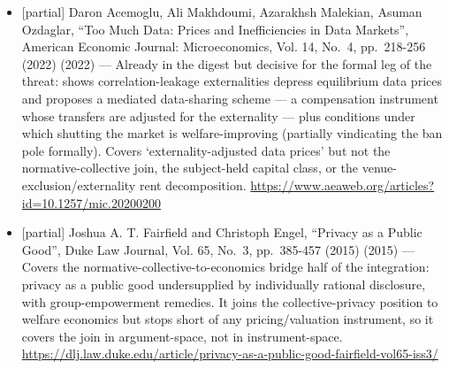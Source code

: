\documentclass[
  11pt,
]{article}
\begin{document}
\begin{itemize}
  data-acquisition mechanism that pays privacy-conscious users for two
  distinct privacy losses --- the local loss from their own disclosure
  and the central loss imposed via the platform's released estimate
  (i.e., the collectively-generated leakage) --- so payments are
  explicitly adjusted for a privacy externality channel. Purely formal:
  no normative collective-privacy engagement, no capital framing, no
  rent decomposition.
  \url{https://pubsonline.informs.org/doi/10.1287/opre.2022.0014}
\item
  {[}partial{]} Daron Acemoglu, Ali Makhdoumi, Azarakhsh Malekian,
  Asuman Ozdaglar, ``Too Much Data: Prices and Inefficiencies in Data
  Markets'', American Economic Journal: Microeconomics, Vol. 14, No.~4,
  pp.~218-256 (2022) (2022) --- Already in the digest but decisive for
  the formal leg of the threat: shows correlation-leakage externalities
  depress equilibrium data prices and proposes a mediated data-sharing
  scheme --- a compensation instrument whose transfers are adjusted for
  the externality --- plus conditions under which shutting the market is
  welfare-improving (partially vindicating the ban pole formally).
  Covers `externality-adjusted data prices' but not the
  normative-collective join, the subject-held capital class, or the
  venue-exclusion/externality rent decomposition.
  \url{https://www.aeaweb.org/articles?id=10.1257/mic.20200200}
\item
  {[}partial{]} Joshua A. T. Fairfield and Christoph Engel, ``Privacy as
  a Public Good'', Duke Law Journal, Vol. 65, No.~3, pp.~385-457 (2015)
  (2015) --- Covers the normative-collective-to-economics bridge half of
  the integration: privacy as a public good undersupplied by
  individually rational disclosure, with group-empowerment remedies. It
  joins the collective-privacy position to welfare economics but stops
  short of any pricing/valuation instrument, so it covers the join in
  argument-space, not in instrument-space.
  \url{https://dlj.law.duke.edu/article/privacy-as-a-public-good-fairfield-vol65-iss3/}
\end{itemize}
\end{document}
